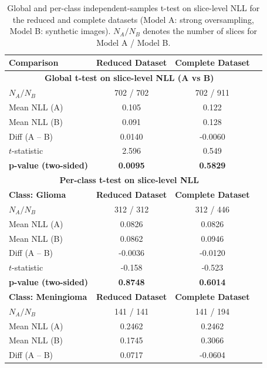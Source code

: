 \begin{table}[ht]
\centering
\caption{Global and per-class independent-samples t-test on slice-level NLL for the reduced and complete datasets (Model A: strong oversampling, Model B: synthetic images). $N_A/N_B$ denotes the number of slices for Model A / Model B.}
\begin{tabular}{lccc}
\toprule
\textbf{Comparison} & \textbf{Reduced Dataset} & \textbf{Complete Dataset} \\
\midrule
\multicolumn{3}{c}{\textbf{Global t-test on slice-level NLL (A vs B)}} \\
\midrule
$N_A / N_B$           & 702 / 702       & 702 / 911      \\
Mean NLL (A)          & 0.105           & 0.122          \\
Mean NLL (B)          & 0.091           & 0.128          \\
Diff (A -- B)         & 0.0140          & -0.0060        \\
$t$-statistic         & 2.596           & 0.549          \\
\textbf{p-value (two-sided)} & \textbf{0.0095} & \textbf{0.5829} \\
\midrule
\multicolumn{3}{c}{\textbf{Per-class t-test on slice-level NLL}} \\
\midrule
\textbf{Class: Glioma} & \textbf{Reduced Dataset} & \textbf{Complete Dataset} \\
$N_A / N_B$           & 312 / 312       & 312 / 446      \\
Mean NLL (A)          & 0.0826          & 0.0826         \\
Mean NLL (B)          & 0.0862          & 0.0946         \\
Diff (A -- B)         & -0.0036         & -0.0120        \\
$t$-statistic         & -0.158          & -0.523         \\
\textbf{p-value (two-sided)} & \textbf{0.8748} & \textbf{0.6014} \\
\midrule
\textbf{Class: Meningioma} & \textbf{Reduced Dataset} & \textbf{Complete Dataset} \\
$N_A / N_B$           & 141 / 141       & 141 / 194      \\
Mean NLL (A)          & 0.2462          & 0.2462         \\
Mean NLL (B)          & 0.1745          & 0.3066         \\
Diff (A -- B)         & 0.0717          & -0.0604        \\

\end{tabular}
\end{table}
